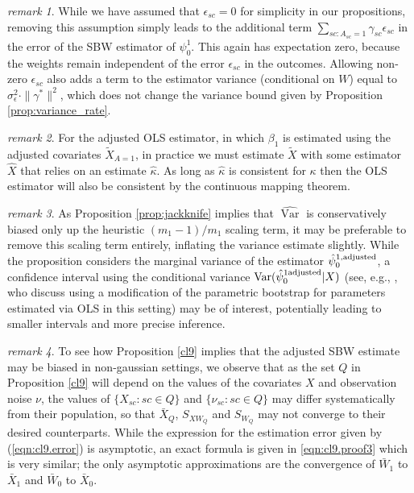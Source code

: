 \documentclass[aoas]{imsart}
\theoremstyle{plain}
\theoremstyle{remark}
\newtheorem{remark}{remark}
\begin{document}
\begin{appendix}
\begin{remark}
    While we have assumed that $\epsilon_{sc}=0$ for simplicity in our propositions, removing this assumption simply leads to the additional term $\sum_{sc: A_{sc} = 1}\gamma_{sc}\epsilon_{sc}$ in the error of the SBW estimator of $\psi_0^1$. This again has expectation zero, because the weights remain independent of the error $\epsilon_{sc}$ in the outcomes. Allowing non-zero $\epsilon_{sc}$ also adds a term to the estimator variance (conditional on $W$) equal to $\sigma^2_{\epsilon}\cdot \|\gamma^*\|^2$,    which does not change the variance bound given by Proposition \ref{prop:variance_rate}.
\end{remark}

\begin{remark}
    For the adjusted OLS estimator, in which $\beta_1$ is estimated using the adjusted covariates $\tilde{X}_{A=1}$, in practice we must estimate $\tilde{X}$ with some estimator $\hat{X}$ that relies on an estimate $\hat{\kappa}$. As long as $\hat{\kappa}$ is consistent for $\kappa$ then the OLS estimator will also be consistent by the continuous mapping theorem.
\end{remark}

\begin{remark}
As Proposition \ref{prop:jackknife} implies that $\hat{\operatorname{Var}}$ is conservatively biased only up the heuristic $(m_1-1)/m_1$ scaling term, it may be preferable to remove this scaling term entirely, inflating the variance estimate slightly. While the proposition considers the marginal variance of the estimator $\hat{\psi}_0^{1,\textup{adjusted}}$, a confidence interval using the conditional variance $\operatorname{Var}(\hat{\psi}_0^{1 \textup{adjusted}}|X)$ (see, e.g., \cite{buonaccorsi2010measurement}, who discuss using a modification of the parametric bootstrap for parameters estimated via OLS in this setting) may be of interest, potentially leading to smaller intervals and more precise inference. 
\end{remark}


\begin{remark}
To see how Proposition \ref{cl9} implies that the adjusted SBW estimate may be biased in non-gaussian settings, we observe that as the set $Q$ in Proposition \ref{cl9} will depend on the values of the covariates $X$ and observation noise $\nu$, the values of $\{X_{sc}: sc \in Q\}$ and $\{\nu_{sc}: sc \in Q\}$ may differ systematically from their population, so that $\bar{X}_Q$, $S_{XW_Q}$ and $S_{W_Q}$ may not converge to their desired counterparts. While the expression for the estimation error given by (\ref{eqn:cl9.error}) is asymptotic, an exact formula is given in \eqref{eqn:cl9.proof3} which is very similar; the only asymptotic approximations are the convergence of $\bar{W}_1$ to $\bar{X}_1$ and $\bar{W}_0$ to $\bar{X}_0$. 
\end{remark}


\end{appendix}
\end{document}
